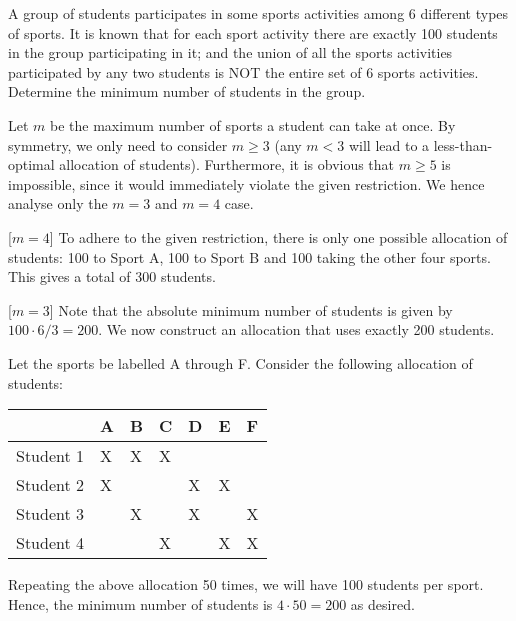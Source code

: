 \begin{question}[200]\label{A::2022-O-1-22}
    A group of students participates in some sports activities among 6 different types of sports. It is known that for each sport activity there are exactly 100 students in the group participating in it; and the union of all the sports activities participated by any two students is NOT the entire set of 6 sports activities. Determine the minimum number of students in the group.
\end{question}
\begin{solution*}
    Let $m$ be the maximum number of sports a student can take at once. By symmetry, we only need to consider $m \geq 3$ (any $m < 3$ will lead to a less-than-optimal allocation of students). Furthermore, it is obvious that $m \geq 5$ is impossible, since it would immediately violate the given restriction. We hence analyse only the $m = 3$ and $m = 4$ case.

    [$m = 4$] To adhere to the given restriction, there is only one possible allocation of students: 100 to Sport A, 100 to Sport B and 100 taking the other four sports. This gives a total of 300 students.

    [$m = 3$] Note that the absolute minimum number of students is given by $100 \cdot 6 / 3 = 200$. We now construct an allocation that uses exactly 200 students.

    Let the sports be labelled A through F. Consider the following allocation of students:
    \begin{table}[H]
        \centering
        \begin{tabular}{|l|l|l|l|l|l|l|}
        \hline
        & A & B & C & D & E & F \\ \hline
        Student 1 & X & X & X &  &  &  \\ \hline
        Student 2 & X &  &  & X & X &  \\ \hline
        Student 3 &  & X &  & X &  & X \\ \hline
        Student 4 &  &  & X &  & X & X \\ \hline
        \end{tabular}
    \end{table}
    Repeating the above allocation 50 times, we will have 100 students per sport. Hence, the minimum number of students is $4 \cdot 50 = 200$ as desired.
\end{solution*}

